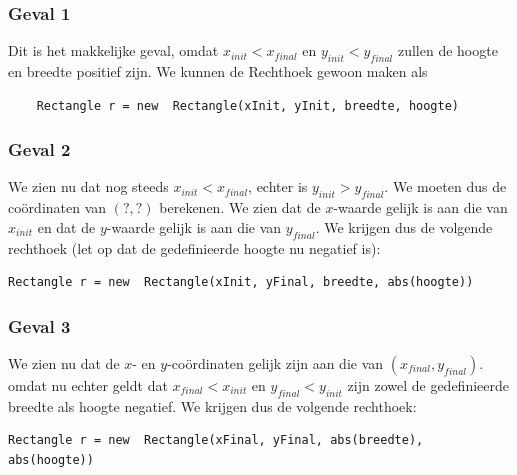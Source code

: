 \documentclass[hidelinks, dutch]{article}
\begin{document}
\subsubsection{Geval 1}
\begin{center}
\end{center}
Dit is het makkelijke geval, omdat $x_{init}<x_{final}$ en $y_{init}<y_{final}$ zullen de hoogte en breedte positief zijn. We kunnen de Rechthoek gewoon maken als
\begin{lstlisting}
	Rectangle r = new  Rectangle(xInit, yInit, breedte, hoogte)
\end{lstlisting}

\subsubsection{Geval 2}
\begin{center}
\end{center}
We zien nu dat nog steeds $x_{init}<x_{final}$, echter is $y_{init}>y_{final}$. We moeten dus de coördinaten van $(?,?)$ berekenen. We zien dat de $x$-waarde gelijk is aan die van $x_{init}$ en dat de $y$-waarde gelijk is aan die van $y_{final}$. We krijgen dus de volgende rechthoek (let op dat de gedefinieerde hoogte nu negatief is): 
\begin{lstlisting}
Rectangle r = new  Rectangle(xInit, yFinal, breedte, abs(hoogte))
\end{lstlisting}

\subsubsection{Geval 3}
\begin{center}
\end{center}
We zien nu dat de $x$- en $y$-coördinaten gelijk zijn aan die van $(x_{final},y_{final})$. omdat nu echter geldt dat $x_{final}<x_{init}$ en $y_{final}<y_{init}$ zijn zowel de gedefinieerde breedte als hoogte negatief. We krijgen dus de volgende rechthoek:
\begin{lstlisting}
Rectangle r = new  Rectangle(xFinal, yFinal, abs(breedte), abs(hoogte))
\end{lstlisting}
\end{document}
